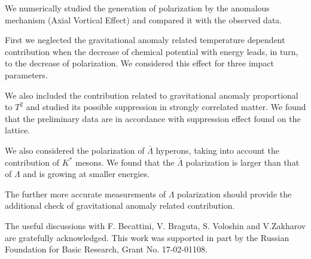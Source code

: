 \documentclass[preprint,aps,showpacs,nofootinbib,superscriptaddress,preprintnumbers,epsf,psf]{revtex4}
\begin{document}



We numerically studied the generation of polarization by the
anomalous mechanism (Axial Vortical Effect) and compared it with the
observed data.

First we neglected the gravitational anomaly related temperature
dependent contribution when the decrease of chemical potential with
energy leads, in turn, to the decrease of polarization. We considered
this effect for three impact parameters.

We also  included the contribution related to gravitational anomaly
proportional to $T^2$ and studied its possible suppression in
strongly correlated matter. We found that the preliminary data are
in accordance with suppression effect found on the lattice.

We also considered the polarization of $\bar \Lambda$ hyperons, taking into account 
the contribution of $K^*$ mesons. We found that the $\bar \Lambda$ polarization is larger than 
that of  $\Lambda$ and is growing at smaller energies.  


The further more accurate measurements of $\Lambda$ polarization
should provide the additional check of gravitational anomaly related
contribution.


%
The useful discussions with F. Becattini, V. Braguta, S. Voloshin and V.Zakharov are gratefully acknowledged.
This work was supported in part by the Russian Foundation for Basic
Research, Grant No. 17-02-01108.

%
\end{document}
